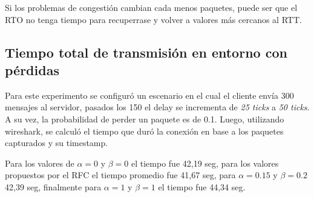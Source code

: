 		Si los problemas de congesti\'on cambian cada menos paquetes, puede ser
		que el RTO no tenga tiempo para recuperrase y volver a valores m\'as
		cercanos al RTT.

    \subsection{Tiempo total de transmisi\'on en entorno con p\'erdidas}
        
        Para este experimento se configur\'o un escenario en el cual el 
        cliente env\'ia 300 mensajes al servidor, pasados los 150 el delay
        se incrementa de \textit{25 ticks} a \textit{50 ticks}. A su vez,
        la probabilidad de perder un paquete es de 0.1.
        Luego, utilizando wireshark, se calcul\'o el tiempo que dur\'o la
        conexi\'on en base a los paquetes capturados y su timestamp.
        
        Para los valores de $\alpha=0$ y $\beta=0$ el tiempo fue 42,19 seg,
        para los valores propuestos por el RFC el tiempo promedio fue
        41,67 seg, para $\alpha=0.15$ y $\beta=0.2$ 42,39 seg, finalmente  
        para $\alpha=1$ y $\beta=1$ el tiempo fue 44,34 seg.
        

